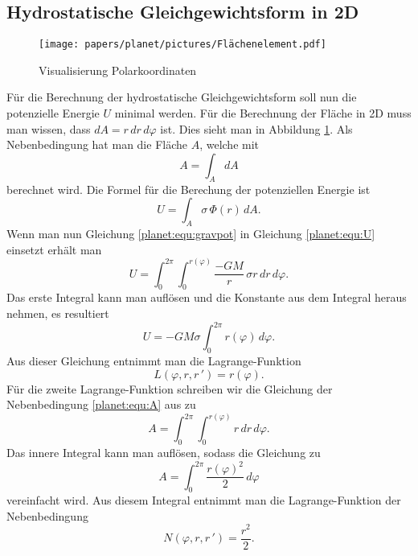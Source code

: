 \subsection{Hydrostatische Gleichgewichtsform in 2D}
\begin{figure}
	\centering
	\texttt{[image: papers/planet/pictures/Flächenelement.pdf]}
	\caption{Visualisierung Polarkoordinaten}
	\label{planet:fig:2d}
\end{figure}
Für die Berechnung der hydrostatische Gleichgewichtsform soll nun die potenzielle Energie \(U\) minimal werden.
Für die Berechnung der Fläche in 2D muss man wissen, dass \(dA = r \, dr \, d\varphi\) ist.
Dies sieht man in Abbildung \ref{planet:fig:2d}.
Als Nebenbedingung hat man die Fläche \(A\), welche mit 
\begin{equation}
	A = \int_{A}^{} dA
	\label{planet:equ:A}
\end{equation}
berechnet wird.
Die Formel für die Berechung der potenziellen Energie ist
\begin{equation}
	U = \int_{A} \sigma \, \Phi (r) \, dA.
	\label{planet:equ:U}
\end{equation}
Wenn man nun Gleichung \eqref{planet:equ:gravpot} in Gleichung \eqref{planet:equ:U} einsetzt erhält man
\begin{equation*}
	U = \int_{0}^{2\pi}\int_{0}^{r(\varphi)} \frac{-GM}{r} \, \sigma r \, dr \, d\varphi.
\end{equation*}
Das erste Integral kann man auflösen und die Konstante aus dem Integral heraus nehmen, es resultiert 
\begin{equation*}
	U =-GM\sigma \int_{0}^{2\pi} r(\varphi) \, d\varphi .
\end{equation*}
Aus dieser Gleichung entnimmt man die Lagrange-Funktion
\begin{equation*}
	L(\varphi ,r,r\,') = r(\varphi).
\end{equation*}
Für die zweite Lagrange-Funktion schreiben wir die Gleichung der Nebenbedingung \eqref{planet:equ:A} aus zu
\begin{equation*}
	A = \int_{0}^{2\pi}\int_{0}^{r(\varphi)} r \, dr \, d\varphi.
\end{equation*}
Das innere Integral kann man auflösen, sodass die Gleichung zu
\begin{equation*}
	A = \int_{0}^{2\pi}\frac{r(\varphi)^2}{2} \, d\varphi
\end{equation*}
vereinfacht wird.
Aus diesem Integral entnimmt man die Lagrange-Funktion der Nebenbedingung
\begin{equation*}
	N(\varphi ,r,r\,') = \frac{r^2}{2}.
\end{equation*}

